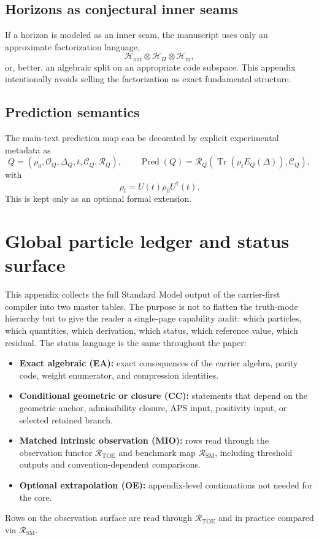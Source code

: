 \documentclass[11pt,a4paper]{article}
\theoremstyle{definition}
\theoremstyle{remark}
\DeclareMathOperator{\tr}{Tr}
\newcommand{\SM}{\mathrm{SM}}
\newcommand{\Pred}{\operatorname{Pred}}
\begin{document}
\subsection{Horizons as conjectural inner seams}

If a horizon is modeled as an inner seam, the manuscript uses only an approximate factorization language,
\[
\mathcal H_{\mathrm{out}}\otimes\mathcal H_H\otimes\mathcal H_{\mathrm{in}},
\]
or, better, an algebraic split on an appropriate code subspace. This appendix intentionally avoids selling the factorization as exact fundamental structure.

\subsection{Prediction semantics}

The main-text prediction map can be decorated by explicit experimental metadata as
\[
Q=(\rho_0,\mathcal O_Q,\Delta_Q,t,\mathcal C_Q,\mathcal R_Q),
\qquad
\Pred(Q)=\mathcal R_Q\!\left(\tr(\rho_tE_Q(\Delta)),\mathcal C_Q\right),
\]
with
\[
\rho_t=U(t)\rho_0U^\dagger(t).
\]
This is kept only as an optional formal extension.

\section{Global particle ledger and status surface}
\label{app:global-particle-ledger}

This appendix collects the full Standard Model output of the carrier-first compiler into two
master tables. The purpose is not to flatten the truth-mode hierarchy but to give the reader a
single-page capability audit: which particles, which quantities, which derivation, which status,
which reference value, which residual. The status language is the same throughout the paper:

\begin{tcolorbox}[colback=tfptblue!2, colframe=tfptblue!50, breakable,
    title={Status legend for the particle ledger}, colbacktitle=tfptblue!70]
\begin{itemize}[leftmargin=1.5em, topsep=3pt, itemsep=2pt]
\item \textbf{Exact algebraic (EA):} exact consequences of the carrier algebra, parity code,
      weight enumerator, and compression identities.
\item \textbf{Conditional geometric or closure (CC):} statements that depend on the geometric
      anchor, admissibility closure, APS input, positivity input, or selected retained branch.
\item \textbf{Matched intrinsic observation (MIO):} rows read through the observation functor
      $\mathcal R_{\mathrm{TOE}}$ and benchmark map $\mathcal R_{\SM}$, including threshold
      outputs and convention-dependent comparisons.
\item \textbf{Optional extrapolation (OE):} appendix-level continuations not needed for the core.
\end{itemize}
Rows on the observation surface are read through $\mathcal R_{\mathrm{TOE}}$ and in practice
compared via $\mathcal R_{\SM}$.
\end{tcolorbox}
\end{document}
